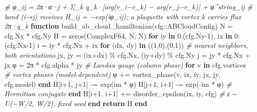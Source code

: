 \documentclass[
]{article}
\newenvironment{Shaded}{}{}
\newcommand{\CommentTok}[1]{\textcolor[rgb]{0.38,0.63,0.69}{\textit{#1}}}
\newcommand{\ConstantTok}[1]{\textcolor[rgb]{0.53,0.00,0.00}{#1}}
\newcommand{\ControlFlowTok}[1]{\textcolor[rgb]{0.00,0.44,0.13}{\textbf{#1}}}
\newcommand{\DataTypeTok}[1]{\textcolor[rgb]{0.56,0.13,0.00}{#1}}
\newcommand{\FloatTok}[1]{\textcolor[rgb]{0.25,0.63,0.44}{#1}}
\newcommand{\FunctionTok}[1]{\textcolor[rgb]{0.02,0.16,0.49}{#1}}
\newcommand{\KeywordTok}[1]{\textcolor[rgb]{0.00,0.44,0.13}{\textbf{#1}}}
\newcommand{\NormalTok}[1]{#1}
\newcommand{\OperatorTok}[1]{\textcolor[rgb]{0.40,0.40,0.40}{#1}}
\begin{document}
\begin{Shaded}
\begin{Highlighting}[]
\CommentTok{\# φ\_ij = 2π·α·j + Σ\_k q\_k·[arg(r\_i−r\_k) − arg(r\_j−r\_k)] + φ\^{}string\_ij}
\CommentTok{\# bond (i→j) receives H\_ij = −exp(iφ\_ij); a plaquette with vortex k carries flux 2π·q\_k}
\KeywordTok{function} \FunctionTok{build\_ab\_cloud\_hamiltonian}\NormalTok{(cfg}\OperatorTok{::}\DataTypeTok{ABCloudConfig}\NormalTok{)}
\NormalTok{    N }\OperatorTok{=}\NormalTok{ cfg.Nx }\OperatorTok{*}\NormalTok{ cfg.Ny}
\NormalTok{    H }\OperatorTok{=} \FunctionTok{zeros}\NormalTok{(}\DataTypeTok{ComplexF64}\NormalTok{, N, N)}
    \ControlFlowTok{for}\NormalTok{ iy }\KeywordTok{in} \FloatTok{0}\OperatorTok{:}\NormalTok{(cfg.Ny}\OperatorTok{{-}}\FloatTok{1}\NormalTok{), ix }\KeywordTok{in} \FloatTok{0}\OperatorTok{:}\NormalTok{(cfg.Nx}\OperatorTok{{-}}\FloatTok{1}\NormalTok{)}
\NormalTok{        i }\OperatorTok{=}\NormalTok{ iy }\OperatorTok{*}\NormalTok{ cfg.Nx }\OperatorTok{+}\NormalTok{ ix}
        \ControlFlowTok{for}\NormalTok{ (dx, dy) }\KeywordTok{in}\NormalTok{ ((}\FloatTok{1}\NormalTok{,}\FloatTok{0}\NormalTok{),(}\FloatTok{0}\NormalTok{,}\FloatTok{1}\NormalTok{))            }\CommentTok{\# nearest neighbors, both orientations}
\NormalTok{            jx, jy }\OperatorTok{=}\NormalTok{ (ix}\OperatorTok{+}\NormalTok{dx) }\OperatorTok{\%}\NormalTok{ cfg.Nx, (iy}\OperatorTok{+}\NormalTok{dy) }\OperatorTok{\%}\NormalTok{ cfg.Ny}
\NormalTok{            j }\OperatorTok{=}\NormalTok{ jy }\OperatorTok{*}\NormalTok{ cfg.Nx }\OperatorTok{+}\NormalTok{ jx}
            \ConstantTok{φ} \OperatorTok{=} \FloatTok{2}\NormalTok{π }\OperatorTok{*}\NormalTok{ cfg.alpha }\OperatorTok{*}\NormalTok{ jy              }\CommentTok{\# Landau gauge (column phase)}
            \ControlFlowTok{for}\NormalTok{ v }\KeywordTok{in}\NormalTok{ cfg.vortices                }\CommentTok{\# vortex phases (model{-}dependent)}
                \ConstantTok{φ} \OperatorTok{+=} \FunctionTok{vortex\_phase}\NormalTok{(v, ix, iy, jx, jy, cfg.model)}
            \ControlFlowTok{end}
\NormalTok{            H[i}\OperatorTok{+}\FloatTok{1}\NormalTok{, j}\OperatorTok{+}\FloatTok{1}\NormalTok{] }\OperatorTok{{-}=} \FunctionTok{exp}\NormalTok{(}\ConstantTok{im} \OperatorTok{*} \ConstantTok{φ}\NormalTok{)}
\NormalTok{            H[j}\OperatorTok{+}\FloatTok{1}\NormalTok{, i}\OperatorTok{+}\FloatTok{1}\NormalTok{] }\OperatorTok{{-}=} \FunctionTok{exp}\NormalTok{(}\OperatorTok{{-}}\ConstantTok{im} \OperatorTok{*} \ConstantTok{φ}\NormalTok{)          }\CommentTok{\# Hermitian conjugate}
        \ControlFlowTok{end}
\NormalTok{        H[i}\OperatorTok{+}\FloatTok{1}\NormalTok{, i}\OperatorTok{+}\FloatTok{1}\NormalTok{] }\OperatorTok{+=} \FunctionTok{disorder\_epsilon}\NormalTok{(ix, iy, cfg)   }\CommentTok{\# ε \textasciitilde{} U(−W/2, W/2), fixed seed}
    \ControlFlowTok{end}
    \ControlFlowTok{return}\NormalTok{ H}
\KeywordTok{end}
\end{Highlighting}
\end{Shaded}
\end{document}
